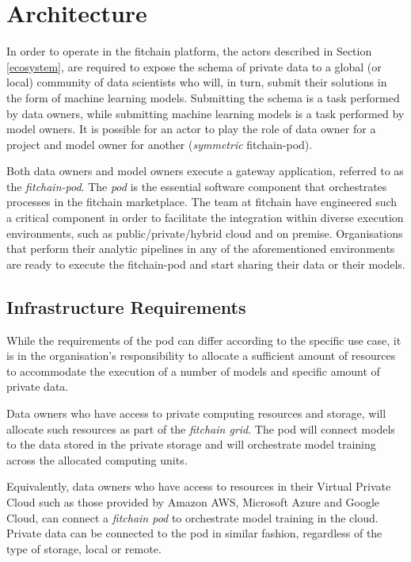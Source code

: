 \documentclass[12pt, a4paper,titlepage]{extreport}
\begin{document}
\section{Architecture}
In order to operate in the fitchain platform, the actors described in Section \ref{ecosystem}, are required to expose the schema of private data to a global (or local) community of data scientists who will, in turn, submit their solutions in the form of machine learning models. Submitting the schema is a task performed by data owners, while submitting machine learning models is a task performed by model owners. 
It is possible for an actor to play the role of data owner for a project and model owner for another (\textit{symmetric} fitchain-pod).

Both data owners and model owners execute a gateway application, referred to as the \textit{fitchain-pod}. The \textit{pod} is the essential software component that orchestrates processes in the fitchain marketplace.
The team at fitchain have engineered such a critical component in order to facilitate the integration within diverse execution environments, such as public/private/hybrid cloud and on premise. 
Organisations that perform their analytic pipelines in any of the aforementioned environments are ready to execute the fitchain-pod and start sharing their data or their models. 

\subsection{Infrastructure Requirements}
While the requirements of the pod can differ according to the specific use case, it is in the organisation's responsibility to allocate a sufficient amount of resources to accommodate the execution of a number of models and specific amount of private data.

Data owners who have access to private computing resources and storage, will allocate such resources as part of the \textit{fitchain grid}. The pod will connect models to the data stored in the private storage and will orchestrate model training across the allocated computing units. 

Equivalently, data owners who have access to resources in their Virtual Private Cloud such as those provided by Amazon AWS, Microsoft Azure and Google Cloud, can connect a \textit{fitchain pod} to orchestrate model training in the cloud. Private data can be connected to the pod in similar fashion, regardless of the type of storage, local or remote.
  
\end{document}
